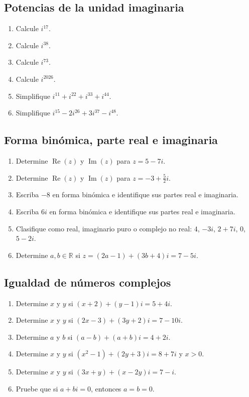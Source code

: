\documentclass[12pt]{article}
\begin{document}
\subsection*{Potencias de la unidad imaginaria}
\begin{enumerate}
\item Calcule $i^{17}$.
\item Calcule $i^{38}$.
\item Calcule $i^{73}$.
\item Calcule $i^{2026}$.
\item Simplifique $i^{11}+i^{22}+i^{33}+i^{44}$.
\item Simplifique $i^{15}-2i^{26}+3i^{37}-i^{48}$.
\end{enumerate}

\subsection*{Forma binómica, parte real e imaginaria}
\begin{enumerate}
\item Determine $\operatorname{Re}(z)$ y $\operatorname{Im}(z)$ para $z=5-7i$.
\item Determine $\operatorname{Re}(z)$ y $\operatorname{Im}(z)$ para $z=-3+\frac{5}{2}i$.
\item Escriba $-8$ en forma binómica e identifique sus partes real e imaginaria.
\item Escriba $6i$ en forma binómica e identifique sus partes real e imaginaria.
\item Clasifique como real, imaginario puro o complejo no real: $4$, $-3i$, $2+7i$, $0$, $5-2i$.
\item Determine $a,b\in\mathbb{R}$ si $z=(2a-1)+(3b+4)i=7-5i$.
\end{enumerate}

\subsection*{Igualdad de números complejos}
\begin{enumerate}
\item Determine $x$ y $y$ si $(x+2)+(y-1)i=5+4i$.
\item Determine $x$ y $y$ si $(2x-3)+(3y+2)i=7-10i$.
\item Determine $a$ y $b$ si $(a-b)+(a+b)i=4+2i$.
\item Determine $x$ y $y$ si $(x^2-1)+(2y+3)i=8+7i$ y $x>0$.
\item Determine $x$ y $y$ si $(3x+y)+(x-2y)i=7-i$.
\item Pruebe que si $a+bi=0$, entonces $a=b=0$.
\end{enumerate}
\end{document}
